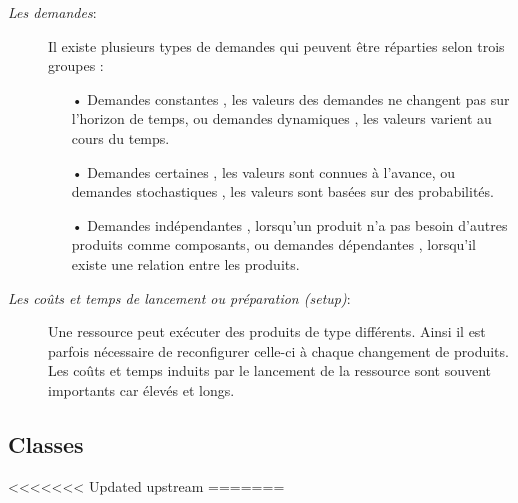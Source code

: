 \documentclass[12pt,a4paper]{article}
\begin{document}
\begin{description}
	\item[\textsl{Les demandes}:] Il existe plusieurs types de demandes qui peuvent être réparties selon trois
groupes :
	\begin{itemize}
		\item[•] Demandes constantes , les valeurs des demandes ne changent pas sur l'horizon de temps, ou demandes dynamiques , les valeurs varient au cours du temps.
		\item[•] Demandes certaines , les valeurs sont connues à l'avance, ou demandes stochastiques , les valeurs sont basées sur des probabilités.
		\item[•] Demandes indépendantes , lorsqu'un produit n'a pas besoin d'autres produits comme composants, ou demandes dépendantes , lorsqu'il existe une relation
entre les produits.
	\end{itemize}

	\item[\textsl{Les coûts et temps de lancement ou préparation (setup)}:] Une ressource peut exécuter des produits de type différents. Ainsi il est parfois nécessaire de reconfigurer celle-ci à chaque changement de produits. Les coûts et temps induits par le lancement de la ressource sont souvent importants car
élevés et longs.
	
\end{description}

\subsection{Classes}
<<<<<<< Updated upstream
=======
\end{document}
